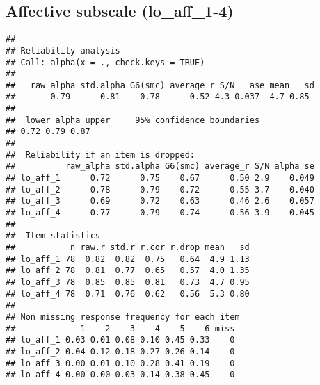 \documentclass[]{article}
\newenvironment{Shaded}{\begin{snugshade}}{\end{snugshade}}
\newcommand{\KeywordTok}[1]{\textcolor[rgb]{0.13,0.29,0.53}{\textbf{#1}}}
\newcommand{\DataTypeTok}[1]{\textcolor[rgb]{0.13,0.29,0.53}{#1}}
\newcommand{\DecValTok}[1]{\textcolor[rgb]{0.00,0.00,0.81}{#1}}
\newcommand{\StringTok}[1]{\textcolor[rgb]{0.31,0.60,0.02}{#1}}
\newcommand{\CommentTok}[1]{\textcolor[rgb]{0.56,0.35,0.01}{\textit{#1}}}
\newcommand{\OtherTok}[1]{\textcolor[rgb]{0.56,0.35,0.01}{#1}}
\newcommand{\OperatorTok}[1]{\textcolor[rgb]{0.81,0.36,0.00}{\textbf{#1}}}
\newcommand{\NormalTok}[1]{#1}
\begin{document}
\subsection{Affective subscale
(lo\_aff\_1-4)}\label{affective-subscale-lo_aff_1-4}

\begin{Shaded}
\end{Shaded}

\begin{verbatim}
## 
## Reliability analysis   
## Call: alpha(x = ., check.keys = TRUE)
## 
##   raw_alpha std.alpha G6(smc) average_r S/N   ase mean   sd
##       0.79      0.81    0.78      0.52 4.3 0.037  4.7 0.85
## 
##  lower alpha upper     95% confidence boundaries
## 0.72 0.79 0.87 
## 
##  Reliability if an item is dropped:
##          raw_alpha std.alpha G6(smc) average_r S/N alpha se
## lo_aff_1      0.72      0.75    0.67      0.50 2.9    0.049
## lo_aff_2      0.78      0.79    0.72      0.55 3.7    0.040
## lo_aff_3      0.69      0.72    0.63      0.46 2.6    0.057
## lo_aff_4      0.77      0.79    0.74      0.56 3.9    0.045
## 
##  Item statistics 
##           n raw.r std.r r.cor r.drop mean   sd
## lo_aff_1 78  0.82  0.82  0.75   0.64  4.9 1.13
## lo_aff_2 78  0.81  0.77  0.65   0.57  4.0 1.35
## lo_aff_3 78  0.85  0.85  0.81   0.73  4.7 0.95
## lo_aff_4 78  0.71  0.76  0.62   0.56  5.3 0.80
## 
## Non missing response frequency for each item
##             1    2    3    4    5    6 miss
## lo_aff_1 0.03 0.01 0.08 0.10 0.45 0.33    0
## lo_aff_2 0.04 0.12 0.18 0.27 0.26 0.14    0
## lo_aff_3 0.00 0.01 0.10 0.28 0.41 0.19    0
## lo_aff_4 0.00 0.00 0.03 0.14 0.38 0.45    0
\end{verbatim}

\begin{Shaded}
\end{Shaded}
\end{document}
